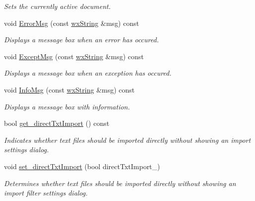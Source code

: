 \begin{DoxyCompactItemize}
\begin{DoxyCompactList}\small\item\em Sets the currently active document. \item\end{DoxyCompactList}\item 
void \hyperlink{classwxStfApp_a4d1d4887f607e088a871b42b6a878bdd}{ErrorMsg} (const \hyperlink{classwxString}{wxString} \&msg) const 
\begin{DoxyCompactList}\small\item\em Displays a message box when an error has occured. \item\end{DoxyCompactList}\item 
void \hyperlink{classwxStfApp_a37646b2722c97ff92abeaecb9b9e7198}{ExceptMsg} (const \hyperlink{classwxString}{wxString} \&msg) const 
\begin{DoxyCompactList}\small\item\em Displays a message box when an exception has occured. \item\end{DoxyCompactList}\item 
void \hyperlink{classwxStfApp_ab18bb61cbd01df81e8577494ed1221a5}{InfoMsg} (const \hyperlink{classwxString}{wxString} \&msg) const 
\begin{DoxyCompactList}\small\item\em Displays a message box with information. \item\end{DoxyCompactList}\item 
bool \hyperlink{classwxStfApp_a2ba47fb8c9f58b21211fbfb915c46a80}{get\_\-directTxtImport} () const 
\begin{DoxyCompactList}\small\item\em Indicates whether text files should be imported directly without showing an import settings dialog. \item\end{DoxyCompactList}\item 
void \hyperlink{classwxStfApp_aa00f88aecbfd73fa18a0141fe42bc879}{set\_\-directTxtImport} (bool directTxtImport\_\-)
\begin{DoxyCompactList}\small\item\em Determines whether text files should be imported directly without showing an import filter settings dialog. \item\end{DoxyCompactList}\item 

\end{DoxyCompactItemize}
